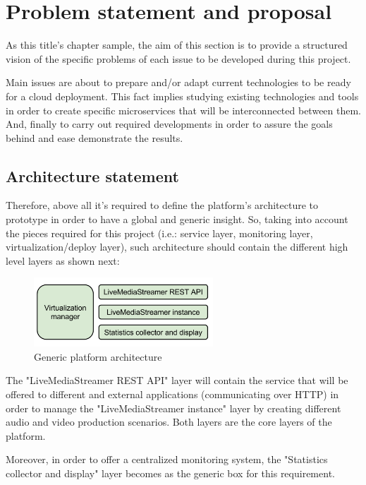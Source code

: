 \chapter{Problem statement and proposal}\label{B:problemStatementAndProposal}

As this title's chapter sample, the aim of this section is to provide a structured vision of the specific problems of each issue to be developed during this project.

Main issues are about to prepare and/or adapt current technologies to be ready for a cloud deployment. This fact implies studying existing technologies and tools in order to create specific microservices that will be interconnected between them. And, finally to carry out required developments in order to assure the goals behind and ease demonstrate the results.

\section{Architecture statement}

Therefore, above all it's required to define the platform's architecture to prototype in order to have a global and generic insight. So, taking into account the pieces required for this project (i.e.: service layer, monitoring layer, virtualization/deploy layer), such architecture should contain the different high level layers as shown next:
\begin{figure}[htb]
\begin{center}
\includegraphics[width=0.6\textwidth]{./images/generalArch.png}
\caption{Generic platform architecture}
\label{F:genericPlatArch}
\end{center}
\end{figure}

The "LiveMediaStreamer REST API" layer will contain the service that will be offered to different and external applications (communicating over HTTP) in order to manage the "LiveMediaStreamer instance" layer by creating different audio and video production scenarios. Both layers are the core layers of the platform. 

Moreover, in order to offer a centralized monitoring system, the "Statistics collector and display" layer becomes as the generic box for this requirement.

